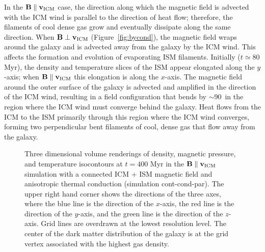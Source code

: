 \documentclass[twocolumn]{aastex6}
\begin{document}
In the $\mathbf{B} \parallel \mathbf{v_{\rm ICM}}$ case, the direction along which the magnetic field is advected with the ICM wind is parallel to the direction of heat flow; therefore, the filaments of cool dense gas grow and eventually dissipate along the same direction. When $\mathbf{B} \perp \mathbf{v_{\rm ICM}}$ (Figure~\ref{fig:bycond}), the magnetic field wraps around the galaxy and is advected away from the galaxy by the ICM wind. This affects the formation and evolution of evaporating ISM filaments. Initially ($t \simeq 80$ Myr), the density and temperature slices of the ISM appear elongated along the $y$-axis; when $\mathbf{B} \parallel \mathbf{v_{\rm ICM}}$ this elongation is along the $x$-axis. The magnetic field around the outer surface of the galaxy is advected and amplified in the direction of the ICM wind, resulting in a field configuration that bends by $\sim$90\arcdeg\ in the region where the ICM wind must converge behind the galaxy. Heat flows from the ICM to the ISM primarily through this region where the ICM wind converges, forming two perpendicular bent filaments of cool, dense gas that flow away from the galaxy. 

\begin{figure*}[!htbp]
  \begin{center}
     \caption{Three dimensional volume renderings of density, magnetic pressure, and temperature isocontours at $t = 400$ Myr in the  $\mathbf{B} \parallel \mathbf{v_{\rm ICM}}$ simulation with a connected ICM + ISM magnetic field and anisotropic thermal conduction (simulation cont-cond-par). The upper right hand corner shows the directions of the three axes, where the blue line is the direction of the $x$-axis, the red line is the direction of the $y$-axis, and the green line is the direction of the $z$-axis. Grid lines are overdrawn at the lowest resolution level. The center of the dark matter distribution of the galaxy is at the grid vertex associated with the highest gas density.    
     \label{fig:3d_bxnocond}}
  \end{center}  
\end{figure*}
\end{document}
